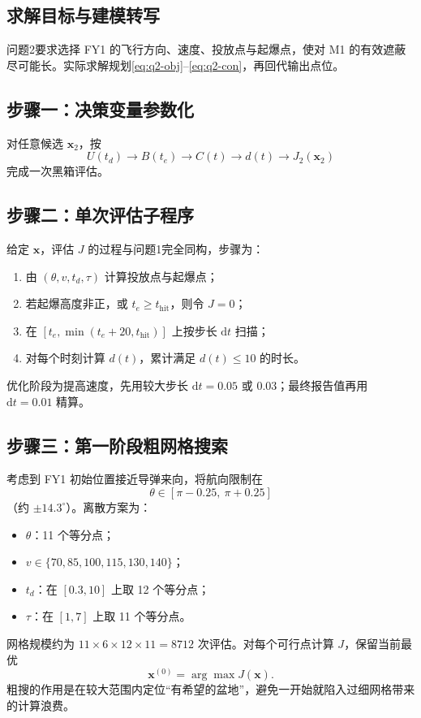\documentclass[withoutpreface,bwprint]{cumcmthesis}
\begin{document}
\subsection{求解目标与建模转写}
问题2要求选择 FY1 的飞行方向、速度、投放点与起爆点，使对 M1 的有效遮蔽尽可能长。实际求解规划\eqref{eq:q2-obj}--\eqref{eq:q2-con}，再回代输出点位。

\subsection{步骤一：决策变量参数化}
对任意候选 $\mathbf{x}_2$，按
\[
U(t_d)\rightarrow B(t_e)\rightarrow C(t)\rightarrow d(t)\rightarrow J_2(\mathbf{x}_2)
\]
完成一次黑箱评估。

\subsection{步骤二：单次评估子程序}
给定 $\mathbf{x}$，评估 $J$ 的过程与问题1完全同构，步骤为：
\begin{enumerate}
  \item 由 $(\theta,v,t_d,\tau)$ 计算投放点与起爆点；
  \item 若起爆高度非正，或 $t_e\ge t_{\mathrm{hit}}$，则令 $J=0$；
  \item 在 $[t_e,\min(t_e+20,t_{\mathrm{hit}})]$ 上按步长 $\mathrm{d}t$ 扫描；
  \item 对每个时刻计算 $d(t)$，累计满足 $d(t)\le 10$ 的时长。
\end{enumerate}
优化阶段为提高速度，先用较大步长 $\mathrm{d}t=0.05$ 或 $0.03$；最终报告值再用 $\mathrm{d}t=0.01$ 精算。

\subsection{步骤三：第一阶段粗网格搜索}
考虑到 FY1 初始位置接近导弹来向，将航向限制在
\[
\theta\in[\pi-0.25,\ \pi+0.25]
\]
（约 $\pm 14.3^\circ$）。离散方案为：
\begin{itemize}
  \item $\theta$：11 个等分点；
  \item $v\in\{70,85,100,115,130,140\}$；
  \item $t_d$：在 $[0.3,10]$ 上取 12 个等分点；
  \item $\tau$：在 $[1,7]$ 上取 11 个等分点。
\end{itemize}
网格规模约为 $11\times 6\times 12\times 11=8712$ 次评估。对每个可行点计算 $J$，保留当前最优
\[
\mathbf{x}^{(0)}=\arg\max J(\mathbf{x}).
\]
粗搜的作用是在较大范围内定位“有希望的盆地”，避免一开始就陷入过细网格带来的计算浪费。
\end{document}
